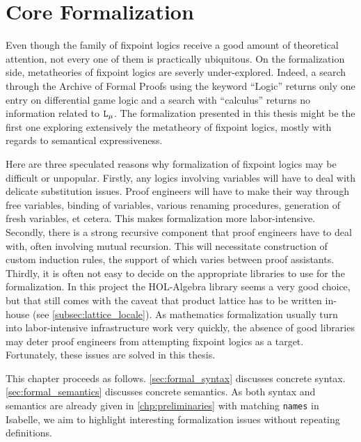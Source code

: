 
\chapter{Core Formalization} 
\label{chp:core_fml}

Even though the family of fixpoint logics receive a good amount of theoretical attention, not every one of them is practically ubiquitous. On the formalization side, metatheories of fixpoint logics are severly under-explored. Indeed, a search through the Archive of Formal Proofs using the keyword ``Logic'' returns only one entry on differential game logic \cite{Differential_Game_Logic-AFP} and a search with ``calculus'' returns no information related to $\texttt{L}_\mu{}$. The formalization presented in this thesis might be the first one exploring extensively the metatheory of fixpoint logics, mostly with regards to semantical expressiveness.

Here are three speculated reasons why formalization of fixpoint logics may be difficult or unpopular. Firstly, any logics involving variables will have to deal with delicate substitution issues. Proof engineers will have to make their way through free variables, binding of variables, various renaming procedures, generation of fresh variables, et cetera. This makes formalization more labor-intensive. Secondly, there is a strong recursive component that proof engineers have to deal with, often involving mutual recursion. This will necessitate construction of custom induction rules, the support of which varies between proof assistants. Thirdly, it is often not easy to decide on the appropriate libraries to use for the formalization. In this project the HOL-Algebra library seems a very good choice, but that still comes with the caveat that product lattice has to be written in-house (see \autoref{subsec:lattice_locale}). As mathematics formalization usually turn into labor-intensive infrastructure work very quickly, the absence of good libraries may deter proof engineers from attempting fixpoint logics as a target. Fortunately, these issues are solved in this thesis.

This chapter proceeds as follows. \autoref{sec:formal_syntax} discusses concrete syntax. \autoref{sec:formal_semantics} discusses concrete semantics. As both syntax and semantics are already given in \autoref{chp:preliminaries} with matching \texttt{names} in Isabelle, we aim to highlight interesting formalization issues without repeating definitions.

